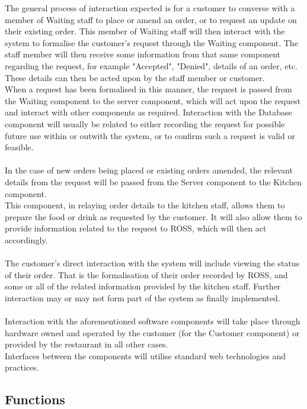 \documentclass[11pt, a4paper]{report}
\begin{document}
\noindent
The general process of interaction expected is for a customer to converse with a member of Waiting staff to place or amend an order, or to request an update on their existing order. This member of Waiting staff will then interact with the system to formalise the customer's request through the Waiting component. The staff member will then receive some information from that same component regarding the request, for example "Accepted", "Denied", details of an order, etc. These details can then be acted upon by the staff member or customer.\\
When a request has been formalised in this manner, the request is passed from the Waiting component to the server component, which will act upon the request and interact with other components as required. Interaction with the Database component will usually be related to either recording the request for possible future use within or outwith the system, or to confirm such a request is valid or feasible.\\
\\
In the case of new orders being placed or existing orders amended, the relevant details from the request will be passed from the Server component to the Kitchen component.\\
This component, in relaying order details to the kitchen staff, allows them to prepare the food or drink as requested by the customer. It will also allow them to provide information related to the request to ROSS, which will then act accordingly.\\
\\
The customer's direct interaction with the system will include viewing the status of their order. That is the formalisation of their order recorded by ROSS, and some or all of the related information provided by the kitchen staff. Further interaction may or may not form part of the system as finally implemented.
\\
\\
Interaction with the aforementioned software components will take place through hardware owned and operated by the customer (for the Customer component) or provided by the restaurant in all other cases.\\
Interfaces between the components will utilise standard web technologies and practices.

\subsection{Functions} \label{subsec:Functions}
\end{document}
